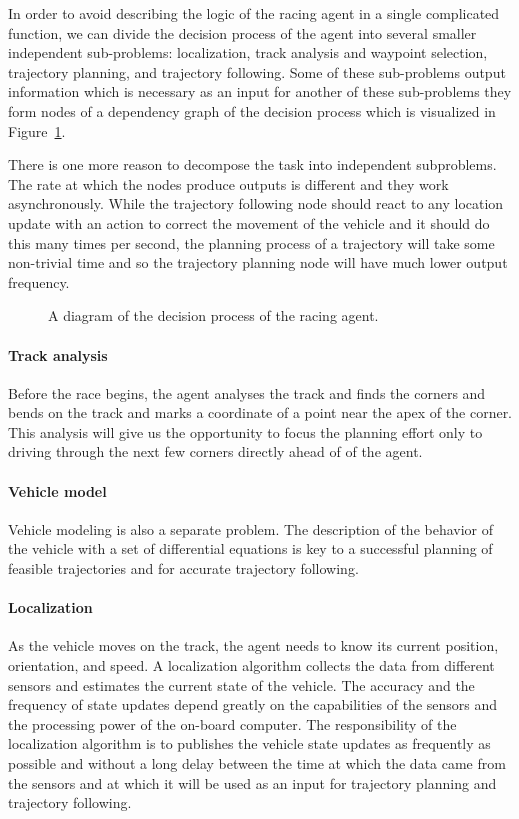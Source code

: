In order to avoid describing the logic of the racing agent in a single complicated function, we can divide the decision process of the agent into several smaller independent sub-problems: localization, track analysis and waypoint selection, trajectory planning, and trajectory following. Some of these sub-problems output information which is necessary as an input for another of these sub-problems they form nodes of a dependency graph of the decision process which is visualized in Figure~\ref{fig:racing_agent_diagram}.

There is one more reason to decompose the task into independent subproblems. The rate at which the nodes produce outputs is different and they work asynchronously. While the trajectory following node should react to any location update with an action to correct the movement of the vehicle and it should do this many times per second, the planning process of a trajectory will take some non-trivial time and so the trajectory planning node will have much lower output frequency.

\begin{figure}[]\centering
\caption{A diagram of the decision process of the racing agent.}
\label{fig:racing_agent_diagram}
\end{figure}

\paragraph{Track analysis} Before the race begins, the agent analyses the track and finds the corners and bends on the track and marks a coordinate of a point near the apex of the corner. This analysis will give us the opportunity to focus the planning effort only to driving through the next few corners directly ahead of of the agent.

\paragraph{Vehicle model} Vehicle modeling is also a separate problem. The description of the behavior of the vehicle with a set of differential equations is key to a successful planning of feasible trajectories and for accurate trajectory following.

\paragraph{Localization} As the vehicle moves on the track, the agent needs to know its current position, orientation, and speed. A localization algorithm collects the data from different sensors and estimates the current state of the vehicle. The accuracy and the frequency of state updates depend greatly on the capabilities of the sensors and the processing power of the on-board computer. The responsibility of the localization algorithm is to publishes the vehicle state updates as frequently as possible and without a long delay between the time at which the data came from the sensors and at which it will be used as an input for trajectory planning and trajectory following.


